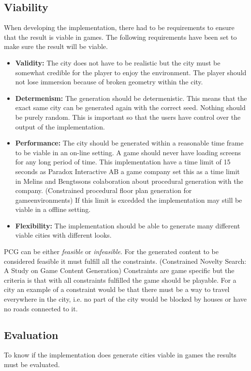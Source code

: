 	
	\subsection{Viability}
	When developing the implementation, there had to be requirements to ensure that the result is viable in games.
	The following requirements have been set to make sure the result will be viable.
	
	\begin{itemize}
		\item \textbf{Validity:} The city does not have to be realistic but the city must be somewhat credible for the player to enjoy the environment. The player should not lose immersion because of broken geometry within the city.
		
		\item \textbf{Determenism:} The generation should be determenistic. This means that the exact same city can be generated again with the correct seed. Nothing should be purely random. This is important so that the users have control over the output of the implementation.
		
		\item \textbf{Performance:} The city should be generated within a reasonable time frame to be viable in an on-line setting. A game should never have loading screens for any long period of time. This implementation have a time limit of 15 seconds as Paradox Interactive AB a game company set this as a time limit in Melins and Bengtssons colaboration about procedural generation with the company. (Constrained procedural floor
		plan generation for gameenvironments) If this limit is excedded the implementation may still be viable in a offline setting.
		
		\item \textbf{Flexibility: } The implementation should be able to generate many different viable cities with different looks.
	\end{itemize} 

	PCG can be either \textit{feasible} or \textit{infeasible}. For the generated content to be considered feasible it must fulfill all the constraints. (Constrained Novelty Search: A Study on Game Content Generation) Constraints are game specific but the criteria is that with all constraints fulfilled the game should be playable. For a city an example of a constraint would be that there must be a way to travel everywhere in the city, i.e. no part of the city would be blocked by houses or have no roads connected to it.
	
	\subsection{Evaluation}
	To know if the implementation does generate cities viable in games the results must be evaluated.